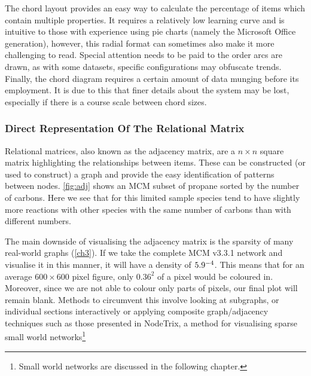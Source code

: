 The chord layout provides an easy way to calculate the percentage of items which contain multiple properties. It requires a relatively low learning curve and is intuitive to those with experience using pie charts (namely the Microsoft Office generation), however, this radial format can sometimes also make it more challenging to read. Special attention needs to be paid to the order arcs are drawn, as with some datasets, specific configurations may obfuscate trends. Finally, the chord diagram requires a certain amount of data munging before its employment. It is due to this that finer details about the system may be lost, especially if there is a course scale between chord sizes.



\subsubsection{Direct Representation Of The Relational Matrix}
Relational matrices, also known as the adjacency matrix, are a $n \times n$ square matrix highlighting the relationships between items. These can be constructed (or used to construct) a graph and provide the easy identification of patterns between nodes. \autoref{fig:adj} shows an MCM subset of propane sorted by the number of carbons. Here we see that for this limited sample species tend to have slightly more reactions with other species with the same number of carbons than with different numbers.


The main downside of visualising the adjacency matrix is the sparsity of many real-world graphs (\autoref{ch3}). If we take the complete MCM v3.3.1 network \citep{mcmpartA} and visualise it in this manner, it will have a density of $5.9 \time 10^{-4}$. This means that for an average $600 \times 600$ pixel figure, only $0.36^2$ of a pixel would be coloured in. Moreover, since we are not able to colour only parts of pixels, our final plot will remain blank. Methods to circumvent this involve looking at subgraphs, or individual sections interactively or applying composite graph/adjacency techniques such as those presented in NodeTrix, a method for visualising sparse small world networks\footnote{Small world networks are discussed in the following chapter.} \citep{nodetrix}
%



